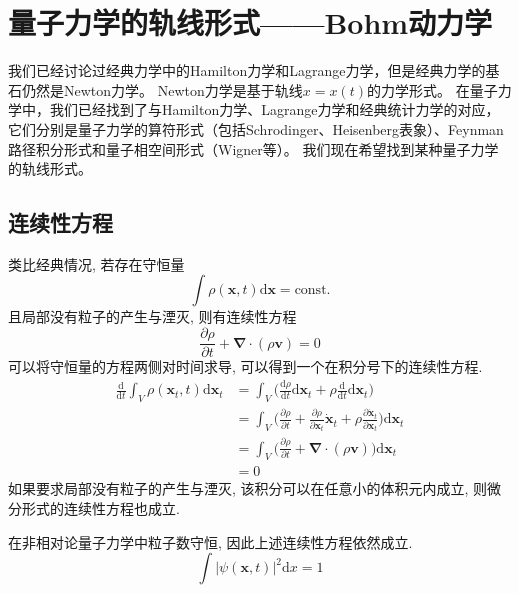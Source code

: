 \chapter{量子力学的轨线形式——Bohm动力学}


    我们已经讨论过经典力学中的Hamilton力学和Lagrange力学，但是经典力学的基石仍然是Newton力学。
    Newton力学是基于轨线\(x = x(t)\)的力学形式。
    在量子力学中，我们已经找到了与Hamilton力学、Lagrange力学和经典统计力学的对应，
    它们分别是量子力学的算符形式（包括Schrodinger、Heisenberg表象）、Feynman路径积分形式和量子相空间形式（Wigner等）。
    我们现在希望找到某种量子力学的轨线形式。

    \section{连续性方程}

        类比经典情况, 若存在守恒量
        \begin{equation}
            \int \rho (\bm{x},t) \mathrm{d} \bm{x} = \text{const.}
        \end{equation}
        且局部没有粒子的产生与湮灭, 则有连续性方程
        \begin{equation}
            \frac {\partial \rho}{\partial t} + \bm{\nabla} \cdot (\rho \bm{v}) = 0
        \end{equation}
        可以将守恒量的方程两侧对时间求导, 可以得到一个在积分号下的连续性方程. 
        \begin{equation}\begin{aligned}
            \frac{\mathrm{d}}{\mathrm{d}t} \int_V \rho (\bm{x}_t, t) \mathrm{d} \bm{x}_t
            & = \int_V \bigg( \frac{\mathrm{d}\rho}{\mathrm{d}t} \mathrm{d} \bm{x}_t + \rho \frac{\mathrm{d}}{\mathrm{d}t} \mathrm{d} \bm{x}_t\bigg) \\
            & = \int_V \bigg( \frac{\partial \rho}{\partial t} + \frac{\partial \rho}{\partial \bm{x}_t}\bm{\dot{x}}_t + \rho \frac{\partial \bm{\dot{x}}_t}{\partial \bm{x}_t} \bigg) \mathrm{d} \bm{x}_t \\
            & = \int_V \bigg( \frac {\partial \rho}{\partial t} + \bm{\nabla} \cdot (\rho \bm{v}) \bigg) \mathrm{d} \bm{x}_t \\
            & = 0 
        \end{aligned}\end{equation}
        如果要求局部没有粒子的产生与湮灭, 该积分可以在任意小的体积元内成立, 则微分形式的连续性方程也成立. 

        在非相对论量子力学中粒子数守恒, 因此上述连续性方程依然成立. 
        \begin{equation}
            \int |\psi(\bm{x},t)|^2 \mathrm{d}x = 1
        \end{equation}

